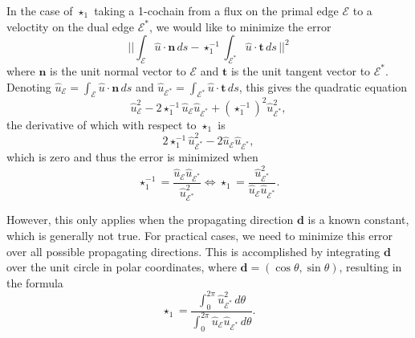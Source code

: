 \documentclass[utf8,english]{gradu3}
\begin{document}
In the case of $\star_1$ taking a 1-cochain from a flux on the primal edge $\mathcal{E}$
to a veloctity on the dual edge $\mathcal{E}^*$,
we would like to minimize the error
\begin{equation}\label{eq:harmonic_error_norm}
  ||\int_{\mathcal{E}} \hat{u} \cdot \mathbf{n} \,ds
  - \star_1^{-1} \int_{\mathcal{E}^*} \hat{u} \cdot \mathbf{t} \,ds\,||^2
\end{equation}
where $\mathbf{n}$ is the unit normal vector to $\mathcal{E}$
and $\mathbf{t}$ is the unit tangent vector to $\mathcal{E}^*$.
Denoting $\hat{u}_{\mathcal{E}} = \int_{\mathcal{E}} \hat{u} \cdot \mathbf{n} \,ds$
and $\hat{u}_{\mathcal{E}^*} = \int_{\mathcal{E}^*} \hat{u} \cdot \mathbf{t} \,ds$,
this gives the quadratic equation
\[
\hat{u}_{\mathcal{E}}^2
- 2 \star_1^{-1} \hat{u}_{\mathcal{E}} \hat{u}_{\mathcal{E}^*}
+ (\star_1^{-1})^2 \hat{u}_{\mathcal{E}^*}^2,
\]
the derivative of which with respect to $\star_1$ is
\[
  2 \star_1^{-1} \hat{u}_{\mathcal{E}^*}^2 - 2 \hat{u}_{\mathcal{E}} \hat{u}_{\mathcal{E}^*},
\]
which is zero and thus the error is minimized when
\[
  \star_1^{-1} = \frac{\hat{u}_{\mathcal{E}} \hat{u}_{\mathcal{E}^*}}{\hat{u}_{\mathcal{E}^*}^2}
  \iff \star_1 = \frac{\hat{u}_{\mathcal{E}^*}^2}{\hat{u}_{\mathcal{E}} \hat{u}_{\mathcal{E}^*}}.
\]

However, this only applies when the propagating direction $\mathbf{d}$
is a known constant, which is generally not true.
For practical cases, we need to minimize this error
over all possible propagating directions.
This is accomplished by integrating $\mathbf{d}$ over the unit circle
in polar coordinates, where $\mathbf{d} = (\cos\theta, \sin\theta)$,
resulting in the formula
\begin{equation}\label{eq:star_1_integral}
  \star_1 = \frac{\int_{0}^{2\pi} \hat{u}_{\mathcal{E}^*}^2 \,d\theta}
  {\int_{0}^{2\pi} \hat{u}_{\mathcal{E}} \hat{u}_{\mathcal{E}^*} \,d\theta}.
\end{equation}
\end{document}
